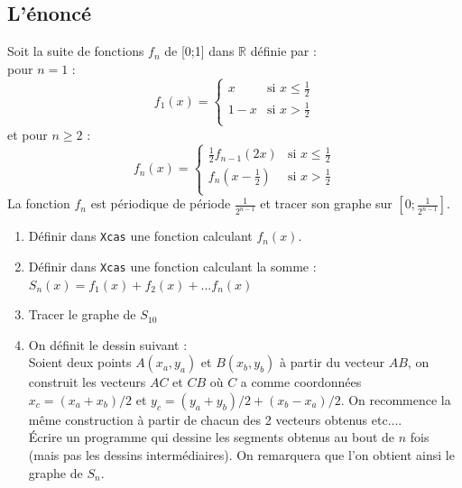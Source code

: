 \documentclass[a4paper,11pt]{book}
\newcommand{\R}{{\mathbb{R}}}
\begin{document}
\subsection{L'\'enonc\'e}
\noindent Soit la suite de fonctions $f_n$ de [0;1] dans $\R$ d\'efinie par :\\
pour $n=1$ :
$$
f_1(x)=
\left\{
\begin{array}{rl}
x & \mbox{si } x\leq \frac{1}{2}\\
1-x & \mbox{si } x> \frac{1}{2}\\
\end{array}
\right.
$$
et pour $n\geq 2$ :
$$
f_n(x)=
\left\{
\begin{array}{rl}
\frac{1}{2}f_{n-1}(2x) & \mbox{si } x\leq \frac{1}{2}\\
f_{n}(x-\frac{1}{2}) & \mbox{si } x> \frac{1}{2}\\
\end{array}
\right.
$$
La fonction $f_n$ est p\'eriodique de p\'eriode 
$\frac{1}{2^{n-1}}$ et tracer son graphe sur $[0; \frac{1}{2^{n-1}}]$.
\begin{enumerate}
\item D\'efinir dans {\tt Xcas} une fonction calculant $f_n(x)$.
\item D\'efinir dans {\tt Xcas} une fonction calculant la somme :\\
$S_n(x)=f_1(x)+f_2(x)+...f_n(x)$
\item Tracer le graphe de $S_{10}$
\item On d\'efinit le dessin suivant :\\
Soient deux points $A(x_a,y_a)$ et $B(x_b,y_b)$
\`a partir du vecteur $AB$, on construit les vecteurs $AC$ et $CB$ o\`u $C$ a 
comme coordonn\'ees $x_c=(x_a+x_b)/2$ et $y_c=(y_a+y_b)/2+(x_b-x_a)/2$.
On recommence la m\^eme construction \`a partir de chacun des 2 vecteurs 
obtenus etc....\\
\'Ecrire un programme qui dessine les segments obtenus au bout de $n$ fois 
(mais pas les dessins interm\'ediaires). On remarquera que l'on obtient ainsi 
le graphe de $S_n$.
\end{enumerate}
\end{document}
